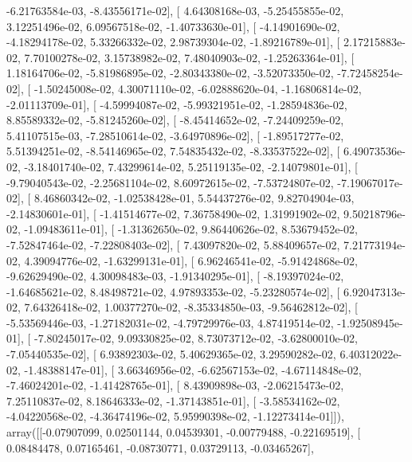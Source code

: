 \documentclass{article}
\begin{document}
         -6.21763584e-03,  -8.43556171e-02],
       [  4.64308168e-03,  -5.25455855e-02,   3.12251496e-02,
          6.09567518e-02,  -1.40733630e-01],
       [ -4.14901690e-02,  -4.18294178e-02,   5.33266332e-02,
          2.98739304e-02,  -1.89216789e-01],
       [  2.17215883e-02,   7.70100278e-02,   3.15738982e-02,
          7.48040903e-02,  -1.25263364e-01],
       [  1.18164706e-02,  -5.81986895e-02,  -2.80343380e-02,
         -3.52073350e-02,  -7.72458254e-02],
       [ -1.50245008e-02,   4.30071110e-02,  -6.02888620e-04,
         -1.16806814e-02,  -2.01113709e-01],
       [ -4.59994087e-02,  -5.99321951e-02,  -1.28594836e-02,
          8.85589332e-02,  -5.81245260e-02],
       [ -8.45414652e-02,  -7.24409259e-02,   5.41107515e-03,
         -7.28510614e-02,  -3.64970896e-02],
       [ -1.89517277e-02,   5.51394251e-02,  -8.54146965e-02,
          7.54835432e-02,  -8.33537522e-02],
       [  6.49073536e-02,  -3.18401740e-02,   7.43299614e-02,
          5.25119135e-02,  -2.14079801e-01],
       [ -9.79040543e-02,  -2.25681104e-02,   8.60972615e-02,
         -7.53724807e-02,  -7.19067017e-02],
       [  8.46860342e-02,  -1.02538428e-01,   5.54437276e-02,
          9.82704904e-03,  -2.14830601e-01],
       [ -1.41514677e-02,   7.36758490e-02,   1.31991902e-02,
          9.50218796e-02,  -1.09483611e-01],
       [ -1.31362650e-02,   9.86440626e-02,   8.53679452e-02,
         -7.52847464e-02,  -7.22808403e-02],
       [  7.43097820e-02,   5.88409657e-02,   7.21773194e-02,
          4.39094776e-02,  -1.63299131e-01],
       [  6.96246541e-02,  -5.91424868e-02,  -9.62629490e-02,
          4.30098483e-03,  -1.91340295e-01],
       [ -8.19397024e-02,  -1.64685621e-02,   8.48498721e-02,
          4.97893353e-02,  -5.23280574e-02],
       [  6.92047313e-02,   7.64326418e-02,   1.00377270e-02,
         -8.35334850e-03,  -9.56462812e-02],
       [ -5.53569446e-03,  -1.27182031e-02,  -4.79729976e-03,
          4.87419514e-02,  -1.92508945e-01],
       [ -7.80245017e-02,   9.09330825e-02,   8.73073712e-02,
         -3.62800010e-02,  -7.05440535e-02],
       [  6.93892303e-02,   5.40629365e-02,   3.29590282e-02,
          6.40312022e-02,  -1.48388147e-01],
       [  3.66346956e-02,  -6.62567153e-02,  -4.67114848e-02,
         -7.46024201e-02,  -1.41428765e-01],
       [  8.43909898e-03,  -2.06215473e-02,   7.25110837e-02,
          8.18646333e-02,  -1.37143851e-01],
       [ -3.58534162e-02,  -4.04220568e-02,  -4.36474196e-02,
          5.95990398e-02,  -1.12273414e-01]]), array([[-0.07907099,  0.02501144,  0.04539301, -0.00779488, -0.22169519],
       [ 0.08484478,  0.07165461, -0.08730771,  0.03729113, -0.03465267],
\end{document}
